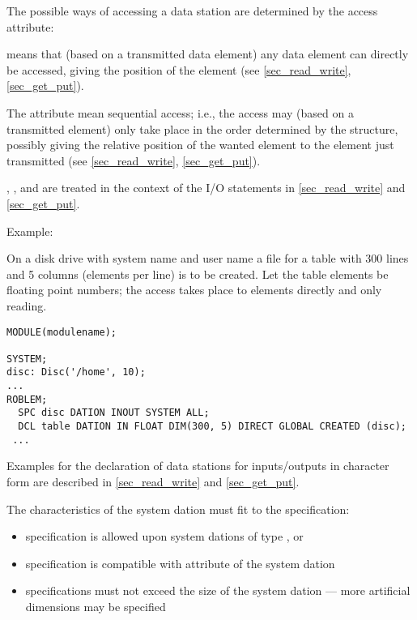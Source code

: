 The possible ways of accessing a data station are determined by the
access attribute:

\begin{grammarframe}

\end{grammarframe}

 
means that (based on a transmitted data element) any data element
can directly be accessed, giving the position of the element
(see \ref{sec_read_write}, \ref{sec_get_put}).

The attribute  
 mean sequential access; i.e., the
access may (based on a transmitted element) only take place in the order
determined by the structure,
possibly giving the relative position of the wanted
element to the element just transmitted 
(see \ref{sec_read_write}, \ref{sec_get_put}).


 , ,
  and 
 are treated in the context of the
I/O statements in 
\ref{sec_read_write} and \ref{sec_get_put}.

Example:

On a disk drive with system name 
 and user name  a file for a
table with 300 lines and 5 columns (elements per line) is to be created.
Let the table elements be floating point numbers; the access takes place
to elements directly and only reading.

\begin{lstlisting}
MODULE(modulename);

SYSTEM;
disc: Disc('/home', 10);
... 
ROBLEM;
  SPC disc DATION INOUT SYSTEM ALL;
  DCL table DATION IN FLOAT DIM(300, 5) DIRECT GLOBAL CREATED (disc);
 ...
\end{lstlisting}

Examples for the declaration of data stations for inputs/outputs in
character form are described in 
\ref{sec_read_write} and \ref{sec_get_put}.

The characteristics of the system dation must fit to the specification:
\begin{itemize}
\item {} specification is allowed upon system dations of type ,
    or 
\item {} specification is compatible with  attribute
   of the system dation
\item {} specifications must not exceed the size of the system dation ---
      more artificial dimensions may be specified
\end{itemize}

